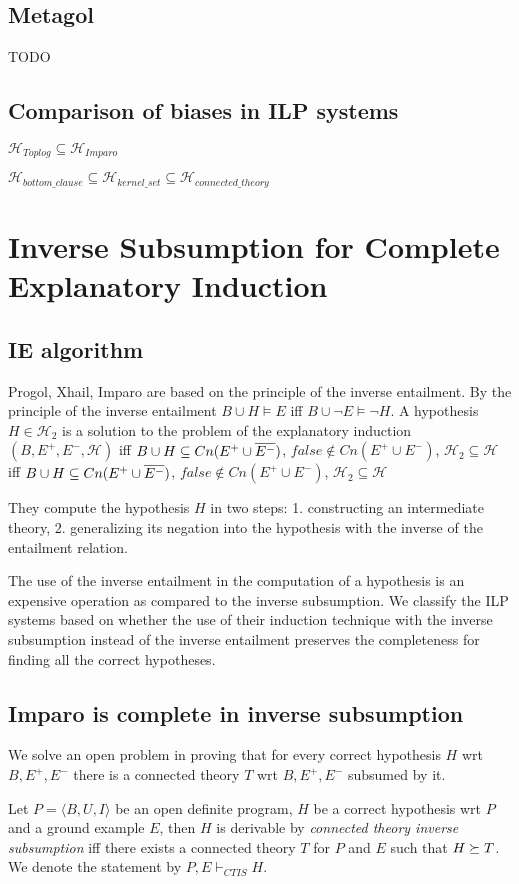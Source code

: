 \subsection{Metagol}
TODO


\subsection{Comparison of biases in ILP systems}
$\mathcal{H}_{Toplog} \subseteq \mathcal{H}_{Imparo}$

$\mathcal{H}_{bottom\_clause} \subseteq \mathcal{H}_{kernel\_set} \subseteq \mathcal{H}_{connected\_theory}$

\section{Inverse Subsumption for Complete Explanatory Induction}\cite{yamamoto2012inverse}

\subsection{IE algorithm\cite{yamamoto2012inverse}}
Progol, Xhail, Imparo are based on the principle of the inverse entailment. By the principle of the inverse entailment $B \cup H \models E$ iff
$B \cup \neg E \models \neg H$. A hypothesis $H \in \mathcal{H}_2$ is a solution to the problem of the explanatory induction $(B,E^{+},E^{-},\mathcal{H})$ iff
$B \cup H \subseteq Cn(E^{+} \cup \overline{E^{-}})$,
 $false \not\in Cn(E^{+} \cup E^{-})$, $\mathcal{H}_2 \subseteq \mathcal{H}$
iff
$B \cup H \subseteq Cn(E^{+} \cup \overline{E^{-}})$,
 $false \not\in Cn(E^{+} \cup E^{-})$, $\mathcal{H}_2 \subseteq \mathcal{H}$
 
They compute the hypothesis $H$ in two steps:
1. constructing an intermediate theory, 2. generalizing its negation into the hypothesis with the inverse of the entailment relation.

The use of the inverse entailment in the computation of a hypothesis is an expensive operation as compared to the inverse subsumption. We classify the ILP systems based on whether the use of their induction technique with the inverse subsumption instead of the inverse entailment preserves the completeness for finding all the correct hypotheses.

\subsection{Imparo is complete in inverse subsumption}
We solve an open problem in \cite{yamamoto2012inverse} proving that for every correct hypothesis $H$ wrt $B, E^{+}, E^{-}$ there is a connected theory $T$ wrt $B, E^{+}, E^{-}$ subsumed by it.
\begin{defn}
Let $P=\langle B, U, I \rangle$ be an open definite program, $H$ be a correct hypothesis wrt $P$ and a ground example $E$, then $H$ is derivable by
\emph{connected theory inverse subsumption}
iff there exists a connected theory $T$ for $P$ and $E$ such that $H \succeq T$.
We denote the statement by $P, E \vdash_{CTIS} H$.
\end{defn}


